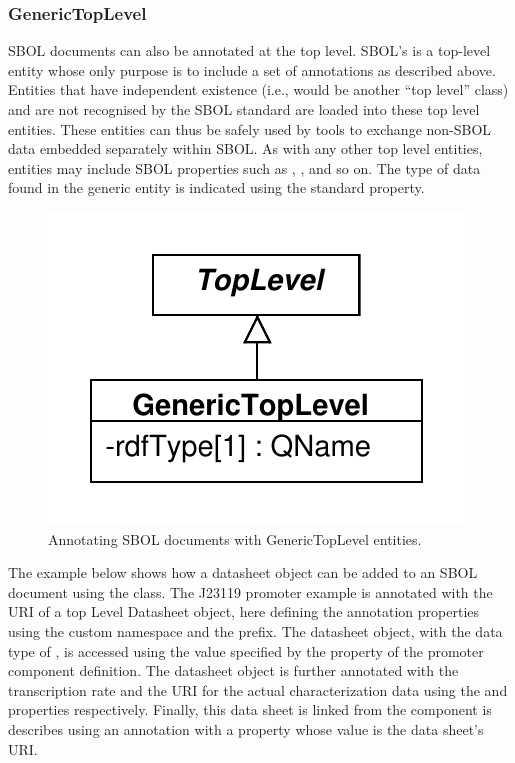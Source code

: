 \subsubsection{GenericTopLevel}  
\label{sec:GenericTopLevel}
SBOL documents can also be annotated at the top level. 
SBOL's  is a top-level entity whose only purpose is to include a set of annotations as described above. 
Entities that have independent existence (i.e., would be another ``top level'' class) and are not recognised by the SBOL standard are loaded into these top level entities. 
These  entities can thus be safely used by tools to exchange non-SBOL data embedded separately within SBOL.
As with any other top level entities,  entities may include SBOL properties such as , ,  and so on. The type of data found in the generic entity is indicated using the standard  property.

\begin{figure}[ht]
\begin{center}
\includegraphics[scale=0.6]{uml/generictoplevel}
\caption[]{Annotating SBOL documents with GenericTopLevel entities.}
\label{uml:generictoplevel}
\end{center}
\end{figure}

The example below shows how a datasheet object can be added to an SBOL document using the  class. 
The J23119 promoter example is annotated with the URI of a top Level Datasheet object, here defining the annotation properties using the custom  namespace and the  prefix. 
The datasheet object, with the data type of , is accessed using the  value specified by the  property of the promoter component definition. 
The datasheet object is further annotated with the transcription rate and the URI for the actual characterization data using the  and  properties respectively.
Finally, this data sheet is linked from the component is describes using an annotation with a  property whose value is the data sheet's URI.

